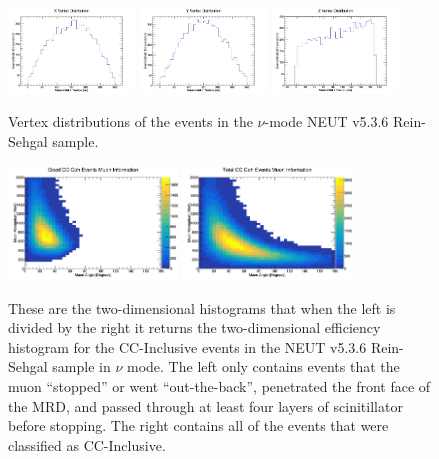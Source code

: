 \documentclass[11pt]{article}
\begin{document}
\begin{figure}[H]
\centering
\includegraphics[width=0.3\textwidth]{NewNMReinSehgalImages/4-XVertexDistributionNMRS.png}
\includegraphics[width=0.3\textwidth]{NewNMReinSehgalImages/3-YVertexDistributionNMRS.png}
\includegraphics[width=0.3\textwidth]{NewNMReinSehgalImages/2-ZVertexDistributionNMRS.png}
\caption{Vertex distributions of the events in the $\nu$-mode NEUT v5.3.6 Rein-Sehgal sample.}
\label{fig:app:NMVertexDistributionRS}
\end{figure}

\begin{figure}[H]
\centering
\includegraphics[width=0.4\textwidth]{NewNMReinSehgalImages/6-GoodCCCohMuonInfoNMRS.png}
\includegraphics[width=0.4\textwidth]{NewNMReinSehgalImages/9-TotalCCCohMuonInfoNMRS.png}
\caption{These are the two-dimensional histograms that when the left is divided by the right it returns the two-dimensional efficiency histogram for the CC-Inclusive events in the NEUT v5.3.6 Rein-Sehgal sample in $\nu$ mode. The left only contains events that the muon ``stopped'' or went ``out-the-back'', penetrated the front face of the MRD, and passed through at least four layers of scinitillator before stopping. The right contains all of the events that were classified as CC-Inclusive.}
\label{fig:app:NMCCInclusiveMuon2DRS}
\end{figure}
\end{document}
